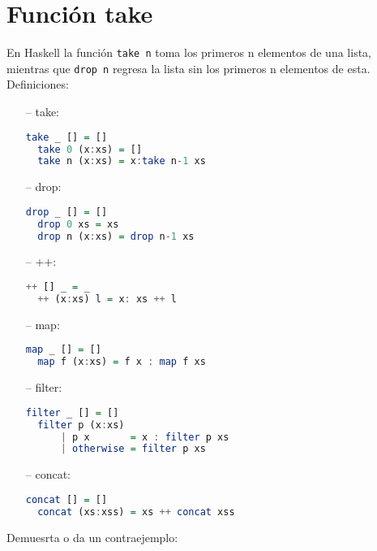 \documentclass[spanish,12pt,letterpaper]{article}
\begin{document}
\section{Función take}
En Haskell la función \texttt{take n} toma los primeros n elementos de una lista,
mientras que \texttt{drop n} regresa la lista sin los primeros n elementos de
esta.\\
\noindent Definiciones:
\begin{itemize}
\item[--] take:
\begin{lstlisting}[language=Haskell]
  take _ [] = []
  take 0 (x:xs) = []
  take n (x:xs) = x:take n-1 xs\end{lstlisting}
\item[--] drop:
\begin{lstlisting}[language=Haskell]
  drop _ [] = []
  drop 0 xs = xs
  drop n (x:xs) = drop n-1 xs\end{lstlisting}
\item[--] ++:
\begin{lstlisting}[language=Haskell]
  ++ [] _ = _
  ++ (x:xs) l = x: xs ++ l\end{lstlisting}

\item[--] map:
\begin{lstlisting}[language=Haskell]
  map _ [] = []
  map f (x:xs) = f x : map f xs
\end{lstlisting}


\item[--] filter:
\begin{lstlisting}[language=Haskell]
  filter _ [] = []
  filter p (x:xs)
      | p x       = x : filter p xs
      | otherwise = filter p xs\end{lstlisting}


\item[--] concat:
\begin{lstlisting}[language=Haskell]
  concat [] = []
  concat (xs:xss) = xs ++ concat xss\end{lstlisting}

\end{itemize}
\noindent Demuesrta o da un contraejemplo:
\end{document}
